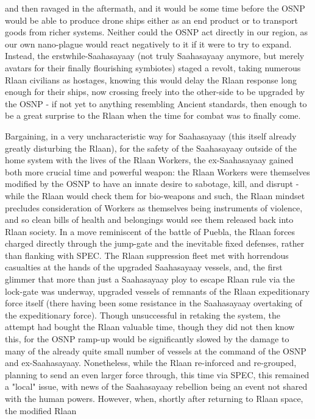 and then ravaged in the aftermath, and it would be some time before
the OSNP would be able to produce drone ships either as an end product
or to transport goods from richer systems. Neither could the OSNP act
directly in our region, as our own nano-plague would react negatively
to it if it were to try to expand. Instead, the erstwhile-Saahasayaay
(not truly Saahasayaay anymore, but merely avatars for their finally
flourishing symbiotes) staged a revolt, taking numerous Rlaan
civilians as hostages, knowing this would delay the Rlaan response
long enough for their ships, now crossing freely into the other-side
to be upgraded by the OSNP - if not yet to anything resembling Ancient
standards, then enough to be a great surprise to the Rlaan when the
time for combat was to finally come.

Bargaining, in a very uncharacteristic way for Saahasayaay (this
itself already greatly disturbing the Rlaan), for the safety of the
Saahasayaay outside of the home system with the lives of the Rlaan
Workers, the ex-Saahasayaay gained both more crucial time and powerful
weapon: the Rlaan Workers were themselves modified by the OSNP to have
an innate desire to sabotage, kill, and disrupt - while the Rlaan
would check them for bio-weapons and such, the Rlaan mindset precludes
consideration of Workers as themselves being instruments of violence,
and so clean bills of health and belongings would see them released
back into Rlaan society. In a move reminiscent of the battle of
Puebla, the Rlaan forces charged directly through the jump-gate and
the inevitable fixed defenses, rather than flanking with SPEC. The
Rlaan suppression fleet met with horrendous casualties at the hands of
the upgraded Saahasayaay vessels, and, the first glimmer that more
than just a Saahasayaay ploy to escape Rlaan rule via the lock-gate
was underway, upgraded vessels of remnants of the Rlaan expeditionary
force itself (there having been some resistance in the Saahasayaay
overtaking of the expeditionary force). Though unsuccessful in
retaking the system, the attempt had bought the Rlaan valuable time,
though they did not then know this, for the OSNP ramp-up would be
significantly slowed by the damage to many of the already quite small
number of vessels at the command of the OSNP and
ex-Saahasayaay. Nonetheless, while the Rlaan re-inforced and
re-grouped, planning to send an even larger force through, this time
via SPEC, this remained a "local" issue, with news of the Saahasayaay
rebellion being an event not shared with the human powers. However,
when, shortly after returning to Rlaan space, the modified Rlaan
